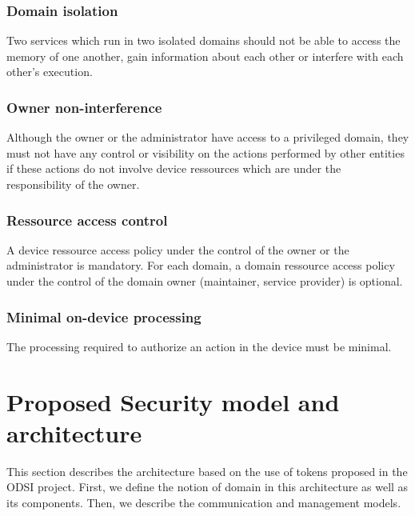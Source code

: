 \documentclass[conference]{IEEEtran}
\begin{document}
\subsubsection{Domain isolation}
Two services which run in two isolated domains should not be able to access the memory of one another, gain information about each other or interfere with each other's execution. 

\subsubsection{Owner non-interference}
Although the owner or the administrator have access to a privileged domain, they must not have any control or visibility on the actions performed by other entities if these actions do not involve device ressources which are under the responsibility of the owner.

\subsubsection{Ressource access control}
A device ressource access policy under the control of the owner or the administrator is mandatory. For each domain, a domain ressource access policy under the control of the domain owner (maintainer, service provider) is optional. 

\subsubsection{Minimal on-device processing}
The processing required to authorize an action in the device must be minimal. 

\section{Proposed Security model and architecture}
\label{sec:Architecture}
This section describes the architecture based on the use of tokens proposed in the ODSI project. First, we define the notion of domain in this architecture as well as its components. Then, we describe the communication and management models.
\end{document}
